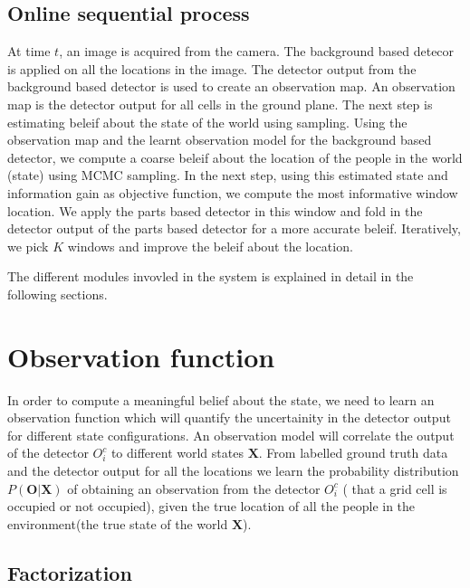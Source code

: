 \documentclass[10pt,twocolumn,letterpaper]{article}
\begin{document}
\subsection{Online sequential process}
At time $t $, an image is acquired from the camera. The background based detecor is applied on all the locations in the image. The detector output from the background based detector is used to create an observation map. An observation map is the detector output for all cells in the ground plane.  The next step is estimating beleif about the state of the world using sampling. Using the observation map and the learnt observation model for the background based detector, we compute a coarse beleif about the location of the people in the world (state) using MCMC sampling. 
In the next step, using this estimated state and information gain as objective function, we compute the most informative window location.
We apply the parts based detector in this window and fold in the detector output of the parts based detector for a more accurate beleif.
Iteratively, we pick $K$ windows and improve the beleif about the location.

The different modules invovled in the system is explained in detail in the following sections.

\section{Observation function}
In order to compute a meaningful belief about the state, we need to learn an observation function which will quantify the uncertainity in the detector output for different state configurations. 
An observation model will correlate the output of the detector $O^{c}_{i}$ to different world states $\textbf{X}$.
From labelled ground truth data and the detector output for all the locations we learn the probability distribution $ P(\textbf{O}|\textbf{X})  $ of
obtaining an observation from the detector $ O^{c}_{i} $ ( that a grid cell is occupied or not occupied), given the true location of all the people in the environment(the true state of the world $\textbf{X}$).

\subsection{Factorization}
\end{document}
